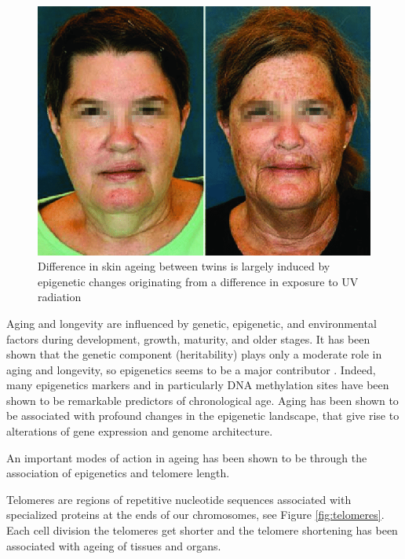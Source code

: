 \documentclass[
  11pt,
]{book}
\begin{document}
\begin{figure}

{\centering \includegraphics[width=0.5\linewidth]{./figs/dentical-twins-with-phenotypic-discordance-due-to-environmental-exposure-Although-MZ} 

}

\caption{Difference in skin ageing between twins is largely induced by epigenetic changes originating from a difference in exposure to UV radiation \citep{Schwab2017}}\label{fig:epiUV}
\end{figure}

Aging and longevity are influenced by genetic, epigenetic, and environmental factors during development, growth, maturity, and older stages.
It has been shown that the genetic component (heritability) plays only a moderate role in aging and longevity, so epigenetics seems to be a major contributor \citep{Adwan2018}. Indeed, many epigenetics markers and in particularly DNA methylation sites have been shown to be remarkable predictors of chronological age.
Aging has been shown to be associated
with profound changes in the epigenetic landscape, that give rise to alterations of gene expression and genome architecture.

An important modes of action in ageing has been shown to be through the association of epigenetics and telomere length.

Telomeres are regions of repetitive nucleotide sequences associated with specialized proteins at the ends of our chromosomes, see Figure \ref{fig:telomeres}. Each cell division the telomeres get shorter and the telomere shortening has been associated with ageing of tissues and organs.
\end{document}
